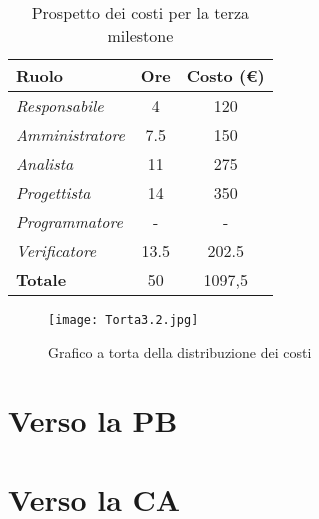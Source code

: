 \begin{table}[H]
    \centering
    \begin{tabular}{|l|c|c|}
    \hline
    \textbf{Ruolo} & \multicolumn{1}{l|}{\textbf{Ore}} & \multicolumn{1}{l|}{\textbf{Costo (€)}} \\ \hline
    \textit{Responsabile}   & 4    & 120   \\ \hline
    \textit{Amministratore} & 7.5  & 150   \\ \hline
    \textit{Analista}       & 11   & 275   \\ \hline
    \textit{Progettista}    & 14   & 350   \\ \hline
    \textit{Programmatore}  & -    & -     \\ \hline
    \textit{Verificatore}   & 13.5 & 202.5 \\ \hline
    \textbf{Totale}         & 50   & 1097,5\\ \hline
    \end{tabular}
    \caption{Prospetto dei costi per la terza milestone}
\end{table}

\begin{figure}[H]
    \texttt{[image: Torta3.2.jpg]}
    \caption{Grafico a torta della distribuzione dei costi} 
\end{figure}

\section{Verso la PB}

\section{Verso la CA}